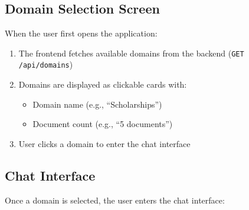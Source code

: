\documentclass[12pt,a4paper]{article}
\begin{document}
\subsection{Domain Selection Screen}

When the user first opens the application:

\begin{enumerate}
    \item The frontend fetches available domains from the backend (\texttt{GET /api/domains})
    \item Domains are displayed as clickable cards with:
    \begin{itemize}
        \item Domain name (e.g., ``Scholarships'')
        \item Document count (e.g., ``5 documents'')
    \end{itemize}
    \item User clicks a domain to enter the chat interface
\end{enumerate}

\subsection{Chat Interface}

Once a domain is selected, the user enters the chat interface:
\end{document}
